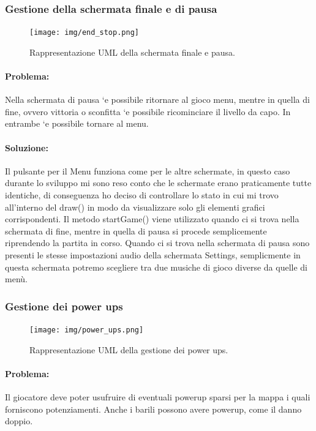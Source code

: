 \documentclass[a4paper,12pt]{report}
\begin{document}
\subsubsection{Gestione della schermata finale e di pausa}

\begin{figure}[H]
\centering{}
\texttt{[image: img/end\_stop.png]}
\caption{Rappresentazione UML della schermata finale e pausa.}
\end{figure}

\paragraph{Problema:}
Nella schermata di pausa `e possibile ritornare al gioco menu, mentre in quella di fine, ovvero vittoria o sconfitta `e possibile ricominciare il livello da capo. In entrambe `e possibile tornare al menu.

\paragraph{Soluzione:}
Il pulsante per il Menu funziona come per le altre schermate, in questo caso durante lo sviluppo mi sono reso conto che le schermate erano praticamente tutte identiche, di conseguenza ho deciso di controllare lo stato in cui mi trovo all’interno del draw() in modo da visualizzare solo gli elementi grafici corrispondenti. Il metodo startGame() viene utilizzato quando ci si trova nella schermata di fine, mentre in quella di pausa si procede semplicemente riprendendo la partita in corso. Quando ci si trova nella schermata di pausa sono presenti le stesse impostazioni audio della schermata Settings, semplicmente in questa schermata potremo scegliere tra due musiche di gioco diverse da quelle di menù.

\subsubsection{Gestione dei power ups}

\begin{figure}[H]
\centering{}
\texttt{[image: img/power\_ups.png]}
\caption{Rappresentazione UML della gestione dei power ups.}
\end{figure}

\paragraph{Problema:}
Il giocatore deve poter usufruire di eventuali powerup sparsi per la mappa i quali forniscono potenziamenti. Anche i barili possono avere powerup, come il danno doppio.
\end{document}
